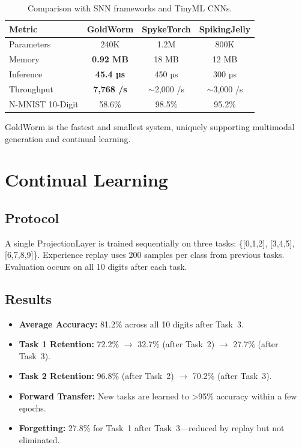 \documentclass[conference]{IEEEtran}
\begin{document}
\begin{table}[h]
\centering
\caption{Comparison with SNN frameworks and TinyML CNNs.}
\label{tab:efficiency}
\begin{tabular}{lccc}
\toprule
\textbf{Metric} & \textbf{GoldWorm} & \textbf{SpykeTorch} & \textbf{SpikingJelly} \\
\midrule
Parameters & 240K & 1.2M & 800K \\
Memory & \textbf{0.92 MB} & 18 MB & 12 MB \\
Inference & \textbf{45.4 µs} & 450 µs & 300 µs \\
Throughput & \textbf{7,768 /s} & $\sim$2,000 /s & $\sim$3,000 /s \\
N-MNIST 10-Digit & 58.6\% & 98.5\% & 95.2\% \\
\bottomrule
\end{tabular}
\end{table}

GoldWorm is the fastest and smallest system, uniquely supporting multimodal generation and continual learning.

\section{Continual Learning}

\subsection{Protocol}
A single ProjectionLayer is trained sequentially on three tasks: \{[0,1,2], [3,4,5], [6,7,8,9]\}. Experience replay uses 200 samples per class from previous tasks. Evaluation occurs on all 10 digits after each task.

\subsection{Results}
\begin{itemize}
    \item \textbf{Average Accuracy:} 81.2\% across all 10 digits after Task~3.
    \item \textbf{Task 1 Retention:} 72.2\% $\rightarrow$ 32.7\% (after Task~2) $\rightarrow$ 27.7\% (after Task~3).
    \item \textbf{Task 2 Retention:} 96.8\% (after Task~2) $\rightarrow$ 70.2\% (after Task~3).
    \item \textbf{Forward Transfer:} New tasks are learned to >95\% accuracy within a few epochs.
    \item \textbf{Forgetting:} 27.8\% for Task~1 after Task~3---reduced by replay but not eliminated.
\end{itemize}
\end{document}
